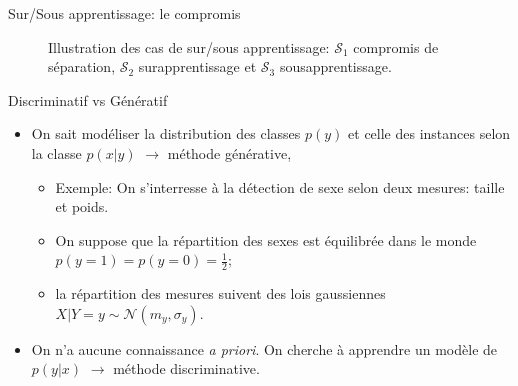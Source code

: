 \documentclass[8pt]{beamer}
\begin{document}
			\begin{frame}{Sur/Sous apprentissage: le compromis}
				\begin{figure}[H]
					
					\caption*{Illustration des cas de sur/sous apprentissage: $\mathscr{S}_1$ compromis de séparation, $\mathscr{S}_2$ surapprentissage et $\mathscr{S}_3$ sousapprentissage.}
				\end{figure}
			\end{frame}
			\begin{frame}{Discriminatif vs Génératif}
				\begin{itemize}
					\item<1-> On sait modéliser la distribution des classes $p(y)$ et celle des instances selon la classe $p(x\vert y)$ $\longrightarrow$ méthode générative,
						\begin{itemize}
							\item<2-> Exemple: On s'interresse à la détection de sexe selon deux mesures: taille et poids.
							\item<3-> On suppose que la répartition des sexes est équilibrée dans le monde $p(y=1) = p(y=0) = \frac{1}{2}$;
							\item<4-> la répartition des mesures suivent des lois gaussiennes $X\vert Y=y \sim \mathscr{N}(m_y, \sigma_y)$.
						\end{itemize}
					\item<5-> On n'a aucune connaissance \textit{a priori}. On cherche à apprendre un modèle de $p(y \vert x)$ $\longrightarrow$ méthode discriminative.
				\end{itemize}
			\end{frame}	
\end{document}
